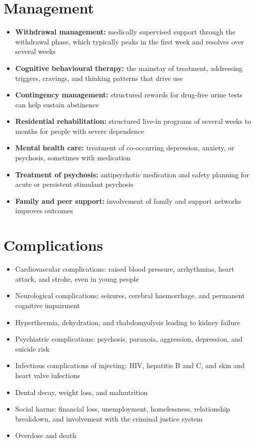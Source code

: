 \section*{Management}
\begin{itemize}
    \item \textbf{Withdrawal management:} medically supervised support through the withdrawal phase, which typically peaks in the first week and resolves over several weeks
    \item \textbf{Cognitive behavioural therapy:} the mainstay of treatment, addressing triggers, cravings, and thinking patterns that drive use
    \item \textbf{Contingency management:} structured rewards for drug-free urine tests can help sustain abstinence
    \item \textbf{Residential rehabilitation:} structured live-in programs of several weeks to months for people with severe dependence
    \item \textbf{Mental health care:} treatment of co-occurring depression, anxiety, or psychosis, sometimes with medication
    \item \textbf{Treatment of psychosis:} antipsychotic medication and safety planning for acute or persistent stimulant psychosis
    \item \textbf{Family and peer support:} involvement of family and support networks improves outcomes
\end{itemize}

\section*{Complications}
\begin{itemize}
    \item Cardiovascular complications: raised blood pressure, arrhythmias, heart attack, and stroke, even in young people
    \item Neurological complications: seizures, cerebral haemorrhage, and permanent cognitive impairment
    \item Hyperthermia, dehydration, and rhabdomyolysis leading to kidney failure
    \item Psychiatric complications: psychosis, paranoia, aggression, depression, and suicide risk
    \item Infectious complications of injecting: HIV, hepatitis B and C, and skin and heart valve infections
    \item Dental decay, weight loss, and malnutrition
    \item Social harms: financial loss, unemployment, homelessness, relationship breakdown, and involvement with the criminal justice system
    \item Overdose and death
\end{itemize}

